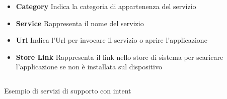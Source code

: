 \begin{itemize}
	\item \textbf{Category}
	Indica la categoria di appartenenza del servizio
	\item \textbf{Service}
	Rappresenta il nome del servizio
	\item \textbf{Url}
	Indica l'Url per invocare il servizio o aprire l'applicazione
	\item \textbf{Store Link}
	Rappresenta il link nello store di sistema per scaricare l'ap\-pli\-ca\-zio\-ne se non è installata sul dispositivo  
\end{itemize}

\begin{listing}[H]
	\inputminted{json}{6-implementazione-app/Codice/esempio_supporto_app.json}
	\caption{Esempio di servizi di supporto con intent}
	\label{lst:esempio-support-app}
\end{listing}